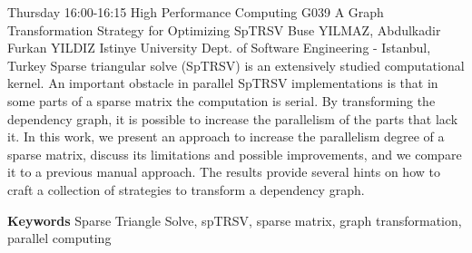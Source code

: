 
    \begin{abstract_basarim}
    {Thursday 16:00-16:15}
    {High Performance Computing}
    {G039}
    {A Graph Transformation Strategy for Optimizing SpTRSV}
    {%
    Buse YILMAZ, Abdulkadir Furkan YILDIZ}
    {%
    }
    {%
    Istinye University Dept. of Software Engineering - Istanbul, Turkey}
    Sparse triangular solve (SpTRSV) is an extensively studied computational kernel. An important obstacle in parallel SpTRSV implementations is that in some parts of a sparse matrix the computation is serial. By transforming the dependency graph, it is possible to increase the parallelism of the parts that lack it. In this work, we present an approach to increase the parallelism degree of a sparse matrix, discuss its limitations and possible improvements, and we compare it to a previous manual approach. The results provide several hints on how to craft a collection of strategies to transform a dependency graph. 
    
        \textbf{Keywords} \newline{}Sparse Triangle Solve, spTRSV, sparse matrix, graph transformation, parallel computing
    \end{abstract_basarim}
    